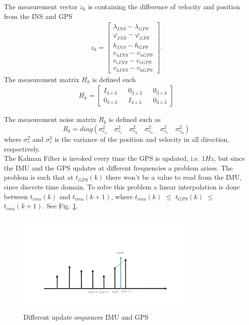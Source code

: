 The measurement vector $z_k$ is containing the difference of velocity and position from the INS and GPS
\begin{align}
z_k =
\begin{bmatrix}
\lambda_{INS} - \lambda_{GPS} \\
\varphi_{INS} - \varphi_{GPS} \\
h_{INS} - h_{GPS} \\
v_{nINS} - v_{nGPS} \\
v_{eINS} - v_{eGPS} \\
v_{hINS} - v_{hGPS}
\end{bmatrix}.
\end{align}
The measurement matrix $H_k$ is defined such
\begin{align}
H_k = 
\begin{bmatrix}
I_{3\times 3} && 0_{3 \times 3} && 0_{3 \times 3} \\
0_{3 \times 3} && I_{3\times 3} && 0_{3 \times 3}
\end{bmatrix}
\end{align}

The measurement noise matrix $R_k$ is defined such as 
\begin{equation}
R_k = diag(\sigma_{r_n}^2 \quad \sigma_{r_e}^2 \quad \sigma_{r_d}^2 \quad \sigma_{v_n}^2 \quad \sigma_{v_e}^2 \quad \sigma_{v_d}^2)
\end{equation}
where $\sigma_{r}^2$ and $\sigma_{v}^2$ is the variance of the position and velocity in all direction, respectively.\\

The Kalman Filter is invoked every time the GPS is updated, i.e. $1Hz$, but since the IMU and the GPS updates at different frequencies a problem arises. The problem is such that at $t_{GPS}(k)$ there won't be a value to read from the IMU, since discrete time domain. To solve this problem a linear interpolation is done between $t_{imu}(k)$ and $t_{imu}(k+1)$, where $t_{imu}(k)$ $\leq$ $t_{GPS}(k)$ $\leq$  $t_{imu}(k+1)$. See Fig. \ref{Fig.different_update}.
\begin{figure}[H]
\centering
\includegraphics[width=0.8\textwidth]{Figures/linear.pdf}
\caption{Different update sequences IMU and GPS}
\label{Fig.different_update}
\end{figure}

